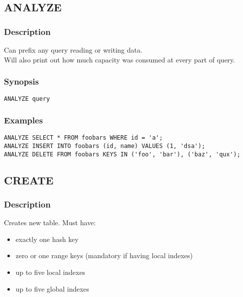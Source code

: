 \subsection{ANALYZE}
\subsubsection{Description}
Can prefix any query reading or writing data.\\
Will also print out how much capacity was consumed at every part of query.
\subsubsection{Synopsis}
\lstset{language=Java}
\begin{lstlisting}
ANALYZE query
\end{lstlisting}
\vspace{20pt}

\subsubsection{Examples}
\lstset{language=Java}
\begin{lstlisting}
ANALYZE SELECT * FROM foobars WHERE id = 'a';
ANALYZE INSERT INTO foobars (id, name) VALUES (1, 'dsa');
ANALYZE DELETE FROM foobars KEYS IN ('foo', 'bar'), ('baz', 'qux');
\end{lstlisting}
\vspace{40pt}

\subsection{CREATE}
\subsubsection{Description}
Creates new table. Must have: 
\begin{itemize}
	\item exactly one hash key
	\item zero or one range keys (mandatory if having local indexes)
	\item up to five local indexes 
	\item up to five global indexes
\end{itemize}

